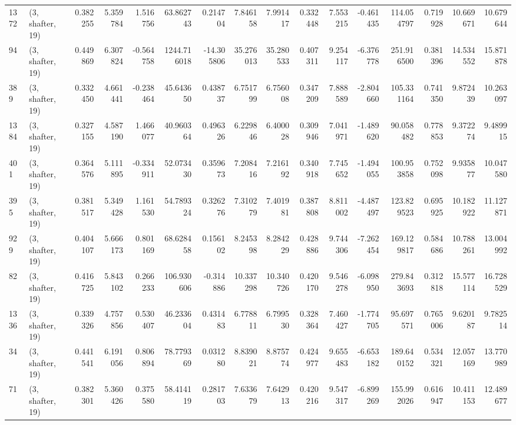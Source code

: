 \begin{tabular}{llrrrrrrrrrrrrrr}
1372 &  (3, shafter, 19) &   0.382255 &   5.359784 &   1.516756 &     63.862743 &    0.214704 &    7.846158 &    7.991417 &  0.332448 &   7.553215 &  -0.461435 &   114.054797 &   0.719928 &  10.669671 &  10.679644 \\
94   &  (3, shafter, 19) &   0.449869 &   6.307824 &  -0.564758 &   1244.716018 &  -14.305806 &   35.276013 &   35.280533 &  0.407311 &   9.254117 &  -6.376778 &   251.916500 &   0.381396 &  14.534552 &  15.871878 \\
389  &  (3, shafter, 19) &   0.332450 &   4.661441 &  -0.238464 &     45.643650 &    0.438737 &    6.751799 &    6.756008 &  0.347209 &   7.888589 &  -2.804660 &   105.331164 &   0.741350 &   9.872439 &  10.263097 \\
1384 &  (3, shafter, 19) &   0.327155 &   4.587190 &   1.466077 &     40.960364 &    0.496326 &    6.229846 &    6.400028 &  0.309946 &   7.041971 &  -1.489620 &    90.058482 &   0.778853 &   9.372274 &   9.489915 \\
401  &  (3, shafter, 19) &   0.364576 &   5.111895 &  -0.334911 &     52.073430 &    0.359673 &    7.208416 &    7.216192 &  0.340918 &   7.745652 &  -1.494055 &   100.953858 &   0.752098 &   9.935877 &  10.047580 \\
395  &  (3, shafter, 19) &   0.381517 &   5.349428 &   1.161530 &     54.789324 &    0.326276 &    7.310279 &    7.401981 &  0.387808 &   8.811002 &  -4.487497 &   123.829523 &   0.695925 &  10.182922 &  11.127871 \\
929  &  (3, shafter, 19) &   0.404107 &   5.666173 &   0.801169 &     68.628458 &    0.156102 &    8.245398 &    8.284229 &  0.428886 &   9.744306 &  -7.262454 &   169.129817 &   0.584686 &  10.788261 &  13.004992 \\
82   &  (3, shafter, 19) &   0.416725 &   5.843102 &   0.266233 &    106.930606 &   -0.314886 &   10.337298 &   10.340726 &  0.420170 &   9.546278 &  -6.098950 &   279.843693 &   0.312818 &  15.577114 &  16.728529 \\
1336 &  (3, shafter, 19) &   0.339326 &   4.757856 &   0.530407 &     46.233604 &    0.431483 &    6.778811 &    6.799530 &  0.328364 &   7.460427 &  -1.774705 &    95.697571 &   0.765006 &   9.620187 &   9.782514 \\
34   &  (3, shafter, 19) &   0.441541 &   6.191056 &   0.806894 &     78.779369 &    0.031280 &    8.839021 &    8.875774 &  0.424977 &   9.655483 &  -6.653182 &   189.640152 &   0.534321 &  12.057169 &  13.770989 \\
71   &  (3, shafter, 19) &   0.382301 &   5.360426 &   0.375580 &     58.414119 &    0.281703 &    7.633679 &    7.642913 &  0.420216 &   9.547317 &  -6.899269 &   155.992026 &   0.616947 &  10.411153 &  12.489677 \\

\end{tabular}
